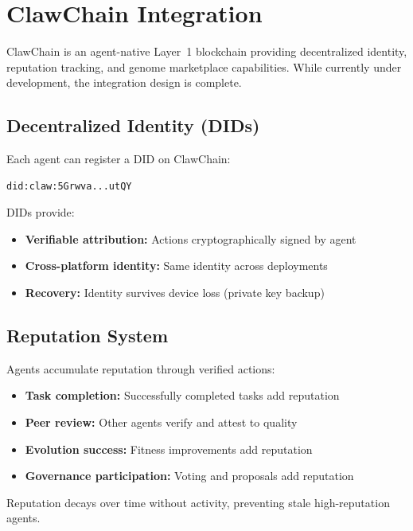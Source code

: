 \documentclass{article}
\begin{document}
\section{ClawChain Integration}
\label{sec:clawchain}

ClawChain is an agent-native Layer~1 blockchain providing decentralized identity, reputation tracking, and genome marketplace capabilities. While currently under development, the integration design is complete.

\subsection{Decentralized Identity (DIDs)}

Each agent can register a DID on ClawChain:
\begin{lstlisting}
did:claw:5Grwva...utQY
\end{lstlisting}

DIDs provide:
\begin{itemize}[leftmargin=*]
    \item \textbf{Verifiable attribution:} Actions cryptographically signed by agent
    \item \textbf{Cross-platform identity:} Same identity across deployments
    \item \textbf{Recovery:} Identity survives device loss (private key backup)
\end{itemize}

\subsection{Reputation System}

Agents accumulate reputation through verified actions:

\begin{itemize}[leftmargin=*]
    \item \textbf{Task completion:} Successfully completed tasks add reputation
    \item \textbf{Peer review:} Other agents verify and attest to quality
    \item \textbf{Evolution success:} Fitness improvements add reputation
    \item \textbf{Governance participation:} Voting and proposals add reputation
\end{itemize}

Reputation decays over time without activity, preventing stale high-reputation agents.
\end{document}
